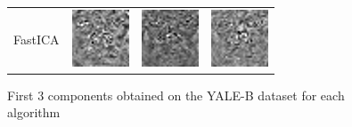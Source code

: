 \documentclass[10pt, a4paper]{article}
\begin{document}
\begin{figure}[h!]
\begin{tabular}{lccc}
FastICA & \includegraphics{yale/yale_ica1} & \includegraphics{yale/yale_ica2} & \includegraphics{yale/yale_ica3} \\
\end{tabular}
\caption{First 3 components obtained on the YALE-B dataset for each algorithm}
\label{compyale}
\end{figure}
\end{document}

